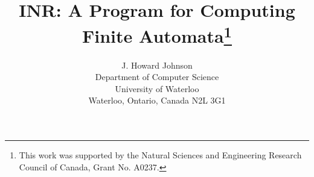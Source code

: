 \title{INR: A Program for Computing\\Finite Automata\thanks{This work was
	supported by the Natural Sciences and Engineering Research Council
	of Canada, Grant No. A0237.}}
\author{J. Howard Johnson\\
	Department of Computer Science\\
	University of Waterloo\\
	Waterloo, Ontario, Canada N2L 3G1}
\newcommand{\lhead}{J. Howard Johnson}
\newcommand{\rhead}{INR: A Program for Computing Finite Automata}











